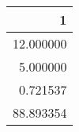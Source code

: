 \begin{tabular}{r}
\toprule
1 \\
\midrule
12.000000 \\
5.000000 \\
0.721537 \\
88.893354 \\
\bottomrule
\end{tabular}
